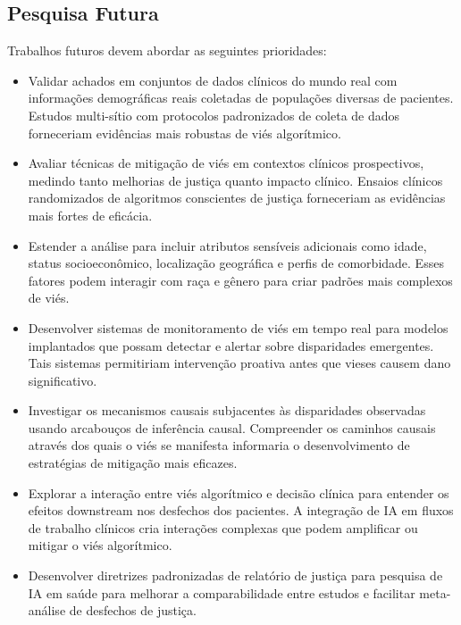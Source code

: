 \subsection{Pesquisa Futura}

Trabalhos futuros devem abordar as seguintes prioridades:

\begin{itemize}[leftmargin=*]
    \item Validar achados em conjuntos de dados clínicos do mundo real com 
          informações demográficas reais coletadas de populações diversas 
          de pacientes. Estudos multi-sítio com protocolos padronizados de 
          coleta de dados forneceriam evidências mais robustas de viés 
          algorítmico.
    \item Avaliar técnicas de mitigação de viés em contextos clínicos 
          prospectivos, medindo tanto melhorias de justiça quanto impacto 
          clínico. Ensaios clínicos randomizados de algoritmos conscientes 
          de justiça forneceriam as evidências mais fortes de eficácia.
    \item Estender a análise para incluir atributos sensíveis adicionais 
          como idade, status socioeconômico, localização geográfica e 
          perfis de comorbidade. Esses fatores podem interagir com raça 
          e gênero para criar padrões mais complexos de viés.
    \item Desenvolver sistemas de monitoramento de viés em tempo real para 
          modelos implantados que possam detectar e alertar sobre disparidades 
          emergentes. Tais sistemas permitiriam intervenção proativa antes 
          que vieses causem dano significativo.
    \item Investigar os mecanismos causais subjacentes às disparidades 
          observadas usando arcabouços de inferência causal. Compreender 
          os caminhos causais através dos quais o viés se manifesta 
          informaria o desenvolvimento de estratégias de mitigação mais 
          eficazes.
    \item Explorar a interação entre viés algorítmico e decisão clínica 
          para entender os efeitos downstream nos desfechos dos pacientes. 
          A integração de IA em fluxos de trabalho clínicos cria interações 
          complexas que podem amplificar ou mitigar o viés algorítmico.
    \item Desenvolver diretrizes padronizadas de relatório de justiça para 
          pesquisa de IA em saúde para melhorar a comparabilidade entre 
          estudos e facilitar meta-análise de desfechos de justiça.
\end{itemize}
